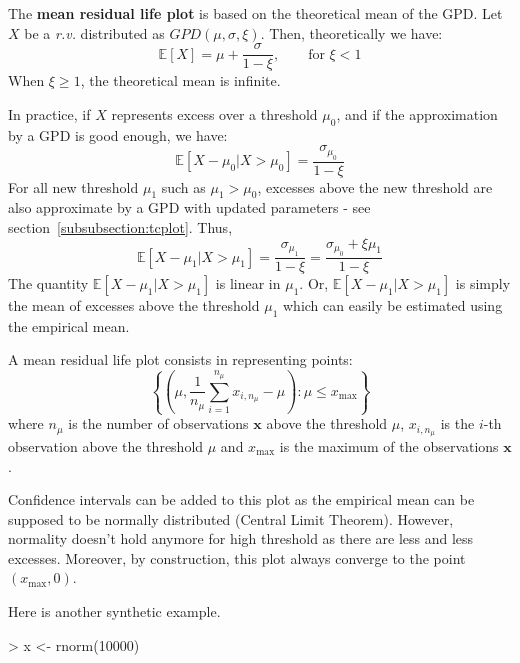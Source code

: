 \documentclass[a4paper]{article}
\numberwithin{equation}{section}
\theoremstyle{definition}
\begin{document}
The \textbf{mean residual life plot} is based on the theoretical mean
of the GPD\@. Let $X$ be a \textit{r.v.} distributed as $GPD(\mu,
\sigma, \xi)$. Then, theoretically we have:
\begin{equation}
  \label{eq:meanGPD}
  \mathbb{E}\left[X \right] = \mu + \frac{\sigma}{1-\xi}, \qquad
  \text{for } \xi < 1
\end{equation}
When $\xi\geq1$, the theoretical mean is infinite.

In practice, if $X$ represents excess over a threshold $\mu_0$, and if
the approximation by a GPD is good enough, we have:
\begin{equation}
  \label{eq:meanExcess}
  \mathbb{E}\left[X - \mu_0 | X > \mu_0 \right] =
  \frac{\sigma_{\mu_0}}{1 - \xi}
\end{equation}
For all new threshold $\mu_1$ such as $\mu_1 > \mu_0$, excesses above
the new threshold are also approximate by a GPD with updated
parameters - see section~\ref{subsubsection:tcplot}. Thus,
\begin{equation}
  \label{eq:meanExcess2}
  \mathbb{E}\left[X - \mu_1 | X > \mu_1 \right] =
  \frac{\sigma_{\mu_1}}{1 - \xi} = \frac{\sigma_{\mu_0} +
    \xi \mu_1}{1 - \xi}
\end{equation}
The quantity $\mathbb{E}\left[X - \mu_1 | X > \mu_1 \right]$ is linear
in $\mu_1$. Or, $\mathbb{E}\left[X - \mu_1 | X > \mu_1 \right]$ is
simply the mean of excesses above the threshold $\mu_1$ which can
easily be estimated using the empirical mean.

A mean residual life plot consists in representing points:
\begin{equation}
  \label{eq:mrlplot}
  \left\{\left(\mu, \frac{1}{n_\mu} \sum_{i=1}^{n_\mu} x_{i, n_\mu} -
      \mu \right) : \mu \leq x_\mathrm{max} \right\}
\end{equation}
where $n_\mu$ is the number of observations $\mathbf{x}$ above the
threshold $\mu$, $x_{i, n_\mu}$ is the $i$-th observation above the
threshold $\mu$ and $x_\mathrm{max}$ is the maximum of the
observations $\mathbf{x}$.

Confidence intervals can be added to this plot as the empirical mean
can be supposed to be normally distributed (Central Limit
Theorem). However, normality doesn't hold anymore for high threshold
as there are less and less excesses. Moreover, by construction, this
plot always converge to the point $(x_\mathrm{max}, 0)$.

Here is another synthetic example.
\begin{Schunk}
\begin{Sinput}
> x <- rnorm(10000)
\end{Sinput}
\end{Schunk}
\end{document}
